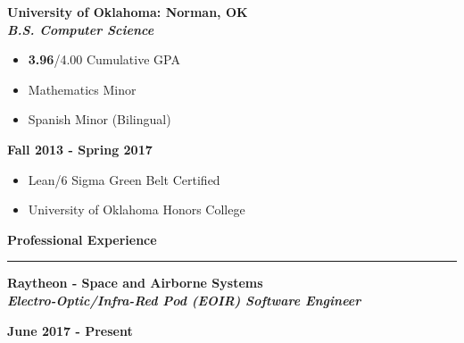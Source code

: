 \documentclass[10pt,letterpaper]{article}
\begin{document}
\begin{minipage}[t]{0.5\textwidth}
        \begin{flushleft}
                \textbf{University of Oklahoma: Norman, OK}\\
                \textbf{\textit{B.S. Computer Science}}

                \begin{itemize}[noitemsep,topsep=0pt]
                        \setlength\itemsep{-0.10em}
                        \item \textbf{3.96}/4.00 Cumulative GPA
                        \item Mathematics Minor
                        \item Spanish Minor (Bilingual)
                \end{itemize}

        \end{flushleft}
\end{minipage}
\begin{minipage}[t]{0.47\textwidth}
        \begin{flushright}
                \textbf{Fall 2013 - Spring 2017}

                \begin{itemize}[noitemsep,topsep=14pt]
                        \item Lean/6 Sigma Green Belt Certified
                        \item University of Oklahoma Honors College
                \end{itemize}

        \end{flushright}
\end{minipage}

\medskip

\begin{large}
        \textbf{Professional Experience}
\end{large}

\smallskip \hrule \smallskip

\begin{minipage}[t]{0.53\textwidth}
        \begin{flushleft}
                \textbf{Raytheon - Space and Airborne Systems}\\
                \textbf{\textit{Electro-Optic/Infra-Red Pod (EOIR) Software Engineer}}\\
        \end{flushleft}
\end{minipage}
\begin{minipage}[t]{0.44\textwidth}
        \begin{flushright}
                \textbf{June 2017 - Present}
        \end{flushright}
\end{minipage}
\end{document}
